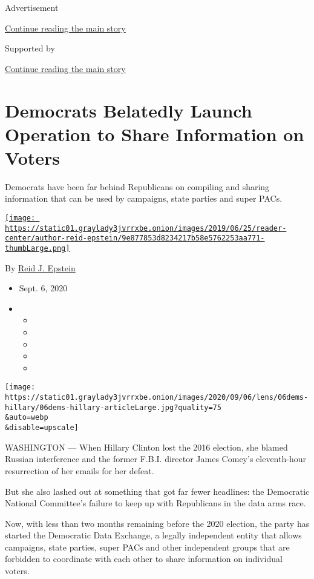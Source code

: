 Advertisement

\protect\hyperlink{after-top}{Continue reading the main story}

Supported by

\protect\hyperlink{after-sponsor}{Continue reading the main story}

\hypertarget{democrats-belatedly-launch-operation-to-share-information-on-voters}{%
\section{Democrats Belatedly Launch Operation to Share Information on
Voters}\label{democrats-belatedly-launch-operation-to-share-information-on-voters}}

Democrats have been far behind Republicans on compiling and sharing
information that can be used by campaigns, state parties and super PACs.

\href{https://www.nytimes3xbfgragh.onion/by/reid-j-epstein}{\texttt{[image: https://static01.graylady3jvrrxbe.onion/images/2019/06/25/reader-center/author-reid-epstein/9e877853d8234217b58e5762253aa771-thumbLarge.png]}}

By \href{https://www.nytimes3xbfgragh.onion/by/reid-j-epstein}{Reid J.
Epstein}

\begin{itemize}
\item
  Sept. 6, 2020
\item
  \begin{itemize}
  \item
  \item
  \item
  \item
  \item
  \end{itemize}
\end{itemize}

\texttt{[image: https://static01.graylady3jvrrxbe.onion/images/2020/09/06/lens/06dems-hillary/06dems-hillary-articleLarge.jpg?quality=75\\\&auto=webp\\\&disable=upscale]}

WASHINGTON --- When Hillary Clinton lost the 2016 election, she blamed
Russian interference and the former F.B.I. director James Comey's
eleventh-hour resurrection of her emails for her defeat.

But she also lashed out at something that got far fewer headlines: the
Democratic National Committee's failure to keep up with Republicans in
the data arms race.

Now, with less than two months remaining before the 2020 election, the
party has started the Democratic Data Exchange, a legally independent
entity that allows campaigns, state parties, super PACs and other
independent groups that are forbidden to coordinate with each other to
share information on individual voters.

